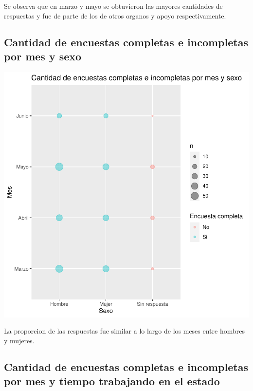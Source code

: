 \documentclass{article}
\begin{document}
Se observa que en marzo y mayo se obtuvieron las mayores cantidades de respuestas y fue de parte de los de otros organos y apoyo respectivamente.

\subsection{Cantidad de encuestas completas e incompletas por mes y sexo}

\includegraphics{seguimientov3-088}

La proporcion de las respuestas fue similar a lo largo de los meses entre hombres y mujeres.

\subsection{Cantidad de encuestas completas e incompletas por mes y tiempo trabajando en el estado}
\end{document}
